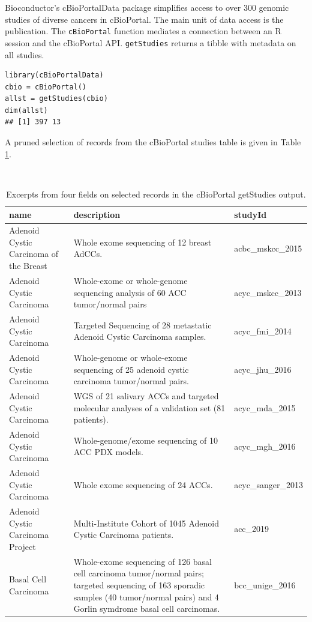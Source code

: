 \documentclass[graybox]{svmult}
\begin{document}
Bioconductor's cBioPortalData package simplifies access to over 300 genomic studies of
diverse cancers in cBioPortal. The main unit of data access is the publication. The
\texttt{cBioPortal} function mediates a connection between an R session and the
cBioPortal API. \texttt{getStudies} returns a tibble with metadata on
all studies.

\begin{shaded}
\begin{verbatim}
library(cBioPortalData)
cbio = cBioPortal()
allst = getStudies(cbio)
dim(allst)
## [1] 397 13
\end{verbatim}
\end{shaded}

A pruned selection of records from the cBioPortal
studies table is given in Table \ref{tab:tab-cball}.

\begin{table}
\caption{\label{tab:tab-cball}Excerpts from four fields on selected records in the cBioPortal getStudies output.}\\
\begin{tabular}{p{5cm}p{5cm}l}
name & description & studyId \\ \hline
Adenoid Cystic Carcinoma of the Breast & Whole exome sequencing of 12 breast AdCCs. & acbc\_mskcc\_2015 \\
Adenoid Cystic Carcinoma & Whole-exome or whole-genome sequencing analysis of 60 ACC tumor/normal pairs & acyc\_mskcc\_2013 \\
Adenoid Cystic Carcinoma & Targeted Sequencing of 28 metastatic Adenoid Cystic Carcinoma samples. & acyc\_fmi\_2014 \\
Adenoid Cystic Carcinoma & Whole-genome or whole-exome sequencing of 25 adenoid cystic carcinoma tumor/normal pairs. & acyc\_jhu\_2016 \\
Adenoid Cystic Carcinoma & WGS of 21 salivary ACCs and targeted molecular analyses of a validation set (81 patients). & acyc\_mda\_2015 \\
Adenoid Cystic Carcinoma & Whole-genome/exome sequencing of 10 ACC PDX models. & acyc\_mgh\_2016 \\
Adenoid Cystic Carcinoma & Whole exome sequencing of 24 ACCs. & acyc\_sanger\_2013 \\
Adenoid Cystic Carcinoma Project & Multi-Institute Cohort of 1045 Adenoid Cystic Carcinoma patients. & acc\_2019 \\
Basal Cell Carcinoma & Whole-exome sequencing of 126 basal cell carcinoma tumor/normal pairs; targeted sequencing of 163 sporadic samples (40 tumor/normal pairs) and 4 Gorlin symdrome basal cell carcinomas. & bcc\_unige\_2016 \\
\end{tabular}
\end{table}
\end{document}
